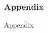 \documentclass[9pt]{beamer}
\begin{document}
        
    


\begin{frame}[noframenumbering]
\frametitle{Appendix}
    
Appendix
\end{frame}
\end{document}
